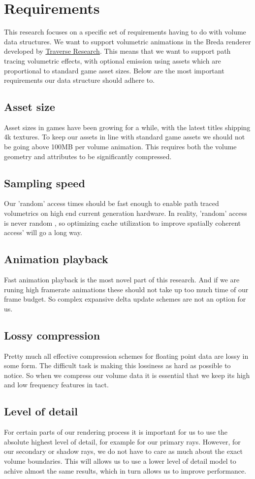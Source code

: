 \section{Requirements} \label{requirements}
This research focuses on a specific set of requirements having to do with volume data structures. We want to support volumetric animations in the Breda renderer developed by \href{https://traverseresearch.nl/}{Traverse Research}. This means that we want to support path tracing volumetric effects, with optional emission using assets which are proportional to standard game asset sizes. Below are the most important requirements our data structure should adhere to.
\subsection{Asset size} \label{requirements:asset_size}
Asset sizes in games have been growing for a while, with the latest titles shipping 4k textures. To keep our assets in line with standard game assets we should not be going above 100MB per volume animation. This requires both the volume geometry and attributes to be significantly compressed.
\subsection{Sampling speed} \label{requirements:sampling_speed}
Our 'random' access times should be fast enough to enable path traced volumetrics on high end current generation hardware. In reality, 'random' access is never random \cite{museth2013vdb}, so optimizing cache utilization to improve spatially coherent access' will go a long way.
\subsection{Animation playback} \label{requirements:animation_playback}
Fast animation playback is the most novel part of this research. And if we are runing high framerate animations these should not take up too much time of our frame budget. So complex expansive delta update schemes are not an option for us.
\subsection{Lossy compression} \label{requirements:lossy_compression}
Pretty much all effective compression schemes for floating point data are lossy in some form. The difficult task is making this lossiness as hard as possible to notice. So when we compress our volume data it is essential that we keep its high and low frequency features in tact.
\subsection{Level of detail} \label{requirements:level_of_detail}
For certain parts of our rendering process it is important for us to use the absolute highest level of detail, for example for our primary rays. However, for our secondary or shadow rays, we do not have to care as much about the exact volume boundaries. This will allows us to use a lower level of detail model to achive almost the same results, which in turn allows us to improve performance.
